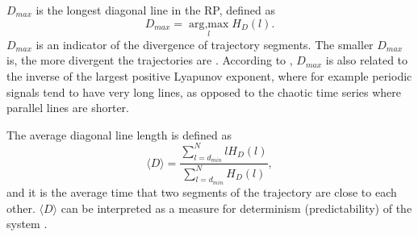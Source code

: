 $D_{max}$ is the longest diagonal line in the RP, defined as
\begin{equation}
D_{max}= \operatorname*{arg,\max}_{l} H_{D}(l).
\end{equation}
$D_{max}$ is an indicator of the divergence of trajectory segments.
The smaller $D_{max}$ is, the more divergent the trajectories are 
\citep{marwan2007, marwan2015}.
According to \cite{iwanski1998}, $D_{max}$ is also related to the inverse 
of the largest positive Lyapunov exponent, where for example periodic signals 
tend to have very long lines, as opposed to the chaotic time series where 
parallel lines are shorter.
  

The average diagonal line length is defined as
\begin{equation}  
	\langle D \rangle = \frac{ \sum^{N}_{l=d_{min}} l H_D(l) }
				{ \sum^{N}_{l=d_{min}}  H_D(l)},
\end{equation}
and it is the average time that two segments of the trajectory are close to 
each other. $\langle D \rangle$ can be interpreted as a measure for 
determinism (predictability) of the system \citep{marwan2007, marwan2015}.
%
  


